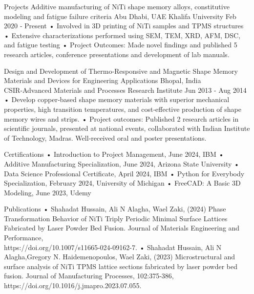 \documentclass[a4paper]{article}
\begin{document}
Projects
Additive manufacturing of NiTi shape memory alloys, constitutive
modeling and fatigue failure criteria Abu Dhabi, UAE
Khalifa University Feb 2020 ‑ Present
• Involved in 3D printing of NiTi samples and TPMS structures
• Extensive characterizations performed using SEM, TEM, XRD, AFM, DSC, and fatigue testing
• Project Outcomes: Made novel findings and published 5 research articles, conference presentations and development
of lab manuals.

Design and Development of Thermo‑Responsive and Magnetic Shape
Memory Materials and Devices for Engineering Applications Bhopal, India
CSIR‑Advanced Materials and Processes Research Institute Jun 2013 ‑ Aug 2014
• Develop copper‑based shape memory materials with superior mechanical properties, high transition temperatures,
and cost‑effective production of shape memory wires and strips.
• Project outcomes: Published 2 research articles in scientific journals, presented at national events, collaborated
with Indian Institute of Technology, Madras. Well‑received oral and poster presentations.

Certifications
• Introduction to Project Management, June 2024, IBM
• Additive Manufacturing Specialization, June 2024, Arizona State University
• Data Science Professional Certificate, April 2024, IBM
• Python for Everybody Specialization, February 2024, University of Michigan
• FreeCAD: A Basic 3D Modeling, June 2023, Udemy

Publications
• Shahadat Hussain, Ali N Alagha, Wael Zaki, (2024) Phase Transformation Behavior of NiTi Triply Periodic Minimal
Surface Lattices Fabricated by Laser Powder Bed Fusion. Journal of Materials Engineering and Performance,\\
https://doi.org/10.1007/s11665-024-09162-7.
• Shahadat Hussain, Ali N Alagha,Gregory N. Haidemenopoulos, Wael Zaki, (2023) Microstructural and surface
analysis of NiTi TPMS lattice sections fabricated by laser powder bed fusion. Journal of Manufacturing Processes,
102:375‑386,\\
https://doi.org/10.1016/j.jmapro.2023.07.055.
\end{document}
